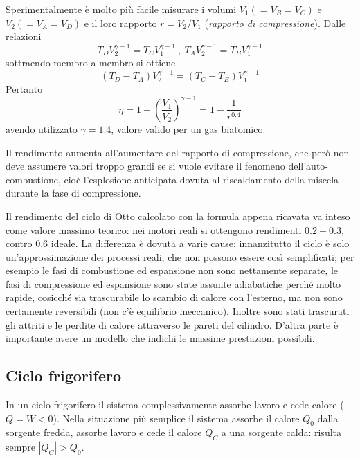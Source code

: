\documentclass[class=book, crop=false, oneside, 12pt]{standalone}
\begin{document}
Sperimentalmente è molto più facile misurare i volumi \(V_1 (= V_B = V_C)\) e \(V_2 (= V_A = V_D)\) e il loro rapporto \(r = V_2 / V_1\) (\emph{rapporto di compressione}). 
Dalle relazioni 
\begin{equation*}
    T_D V_2^{\gamma - 1} = T_C V_1^{\gamma - 1} \ , \ T_A V_2^{\gamma - 1} = T_B V_1^{\gamma - 1} 
\end{equation*}
sottraendo membro a membro si ottiene
\begin{equation*}
    \left(T_D - T_A\right) V_2^{\gamma - 1} = \left(T_C - T_B \right) V_1^{\gamma - 1}
\end{equation*}
Pertanto
\begin{equation*}
    \eta = 1 - (\frac{V_1}{V_2})^{\gamma - 1} = 1 - \frac{1}{r^{0.4}}
\end{equation*}
avendo utilizzato \(\gamma = 1.4\), valore valido per un gas biatomico.

Il rendimento aumenta all'aumentare del rapporto di compressione, che però non deve assumere valori troppo grandi se si vuole evitare il fenomeno dell'auto-combustione, cioè l'esplosione anticipata dovuta al riscaldamento della miscela durante la fase di compressione. 

Il rendimento del ciclo di Otto calcolato con la formula appena ricavata va inteso come valore massimo teorico: nei motori reali si ottengono rendimenti \(0.2 - 0.3\), contro \(0.6\) ideale. 
La differenza è dovuta a varie cause: innanzitutto il ciclo è solo un'approssimazione dei processi reali, che non possono essere così semplificati; per esempio le fasi di combustione ed espansione non sono nettamente separate, le fasi di compressione ed espansione sono state assunte adiabatiche perché molto rapide, cosicché sia trascurabile lo scambio di calore con l'esterno, ma non sono certamente reversibili (non c'è equilibrio meccanico). 
Inoltre sono stati trascurati gli attriti e le perdite di calore attraverso le pareti del cilindro. 
D'altra parte è importante avere un modello che indichi le massime prestazioni possibili.

\subsection{Ciclo frigorifero}

In un ciclo frigorifero il sistema complessivamente assorbe lavoro e cede calore (\(Q = W < 0\)). 
Nella situazione più semplice il sistema assorbe il calore \(Q_0\) dalla sorgente fredda, assorbe lavoro e cede il calore \(Q_C\) a una sorgente calda: risulta sempre \(|Q_C| > Q_0\).
\end{document}
